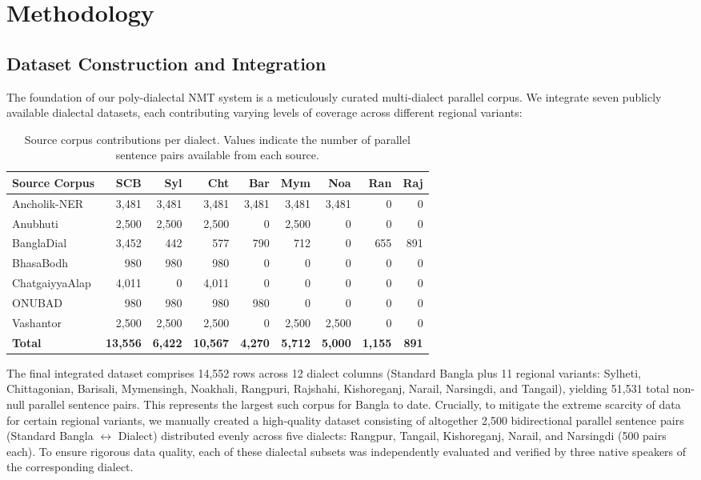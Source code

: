 \documentclass[12pt,a4paper]{article}
\begin{document}
\newpage

\section{Methodology}

\subsection{Dataset Construction and Integration}
The foundation of our poly-dialectal NMT system is a meticulously curated multi-dialect parallel corpus. We integrate seven publicly available dialectal datasets, each contributing varying levels of coverage across different regional variants:

\begin{table}[htbp]
\centering
\caption{Source corpus contributions per dialect. Values indicate the number of parallel sentence pairs available from each source.}
\label{tab:source_contributions}
\small
\begin{tabular}{l r r r r r r r r}
\toprule
\textbf{Source Corpus} & \textbf{SCB} & \textbf{Syl} & \textbf{Cht} & \textbf{Bar} & \textbf{Mym} & \textbf{Noa} & \textbf{Ran} & \textbf{Raj} \\
\midrule
Ancholik-NER   & 3,481 & 3,481 & 3,481 & 3,481 & 3,481 & 3,481 & 0     & 0 \\
Anubhuti        & 2,500 & 2,500 & 2,500 & 0     & 2,500 & 0     & 0     & 0 \\
BanglaDial      & 3,452 & 442   & 577   & 790   & 712   & 0     & 655   & 891 \\
BhasaBodh       & 980   & 980   & 980   & 0     & 0     & 0     & 0     & 0 \\
ChatgaiyyaAlap  & 4,011 & 0     & 4,011 & 0     & 0     & 0     & 0     & 0 \\
ONUBAD          & 980   & 980   & 980   & 980   & 0     & 0     & 0     & 0 \\
Vashantor       & 2,500 & 2,500 & 2,500 & 0     & 2,500 & 2,500 & 0     & 0 \\
\midrule
\textbf{Total}  & \textbf{13,556} & \textbf{6,422} & \textbf{10,567} & \textbf{4,270} & \textbf{5,712} & \textbf{5,000} & \textbf{1,155} & \textbf{891} \\
\bottomrule
\end{tabular}
\end{table}

The final integrated dataset comprises 14,552 rows across 12 dialect columns (Standard Bangla plus 11 regional variants: Sylheti, Chittagonian, Barisali, Mymensingh, Noakhali, Rangpuri, Rajshahi, Kishoreganj, Narail, Narsingdi, and Tangail), yielding 51,531 total non-null parallel sentence pairs. This represents the largest such corpus for Bangla to date. Crucially, to mitigate the extreme scarcity of data for certain regional variants, we manually created a high-quality dataset consisting of altogether 2,500 bidirectional parallel sentence pairs (Standard Bangla $\leftrightarrow$ Dialect) distributed evenly across five dialects: Rangpur, Tangail, Kishoreganj, Narail, and Narsingdi (500 pairs each). To ensure rigorous data quality, each of these dialectal subsets was independently evaluated and verified by three native speakers of the corresponding dialect.
\end{document}
